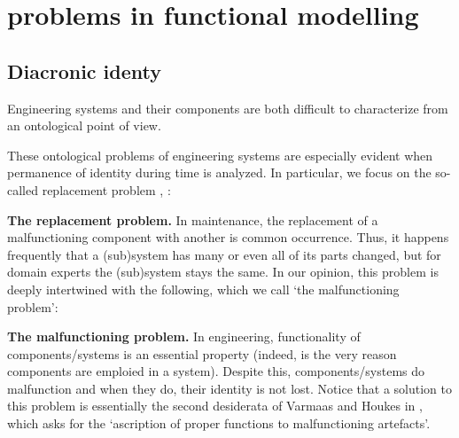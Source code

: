 \documentclass[
]{ceurart}
\begin{document}
\section{ problems in functional modelling}

\subsection{Diacronic identy}\label{subsec:identity}

Engineering systems and their components are both difficult to characterize from an ontological point of view.  

These ontological problems of engineering systems are especially evident when permanence of identity during time is analyzed. In particular, we focus on the so-called replacement problem \cite{guarinoArtefactualSystemsMissing2014},  \cite[Chapter 14]{westDevelopingHighQuality2011}:
\bflist
\item[\mypb{replacement}] \textbf{The replacement problem.} In maintenance, the replacement of a malfunctioning component with another is common occurrence. Thus, it happens frequently that a (sub)system has many or even all of its parts changed, but for domain experts the (sub)system stays the same. 
\eflist
In our opinion, this problem is deeply intertwined with the following, which we call `the malfunctioning problem':
\bflist
\item[\mypb{malfunctioning}] \textbf{The malfunctioning problem.} In engineering, functionality of components/systems is an essential property (indeed, is the very reason components are emploied in a system). Despite this, components/systems do malfunction and when they do, their identity is not lost. 
\eflist
Notice that a solution to this problem is essentially the second desiderata of Varmaas and Houkes in \cite{vermaasAscribingFunctionsTechnical2003}, which asks for the `ascription of proper functions to malfunctioning artefacts'.
\end{document}

